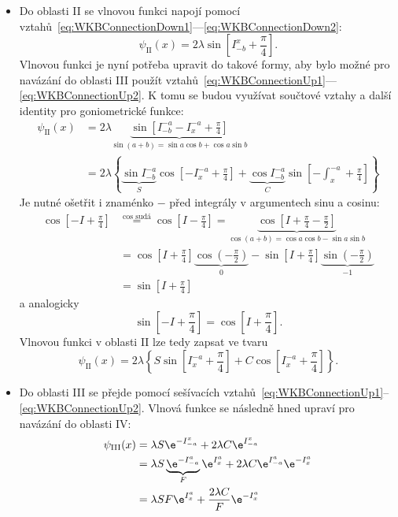 \begin{solution}
\begin{enumerate}
\begin{itemize}
		\item
			Do oblasti II se vlnovou funkci napojí pomocí vztahů~\eqref{eq:WKBConnectionDown1}---\eqref{eq:WKBConnectionDown2}:
			\begin{equation}
				\psi_{\mathrm{II}}(x)=2\lambda\sin{\left[I_{-b}^{x}+\frac{\pi}{4}\right]}.
			\end{equation}
			Vlnovou funkci je nyní potřeba upravit do takové formy, aby bylo možné pro navázání do oblasti III použít vztahů~\eqref{eq:WKBConnectionUp1}---\eqref{eq:WKBConnectionUp2}.
			K tomu se budou využívat součtové vztahy a další identity pro goniometrické funkce:
			\begin{align}
				\psi_{\mathrm{II}}(x)
					&=2\lambda\underbrace{\sin{\left[I_{-b}^{-a}-I_{x}^{-a}+\frac{\pi}{4}\right]}}_{\sin{(a+b)}=\sin{a}\cos{b}+\cos{a}\sin{b}}\nonumber\\
					&=2\lambda\left\{\underbrace{\sin{I_{-b}^{-a}}}_{S}\cos\left[-I_{x}^{-a}+\frac{\pi}{4}\right]+\underbrace{\cos{I_{-b}^{-a}}}_{C}\sin\left[-\int_{x}^{-a}+\frac{\pi}{4}\right]\right\}
			\end{align}
			Je nutné ošetřit i znaménko $-$ před integrály v argumentech sinu a cosinu:
			\begin{align}
				\cos\left[-I+\frac{\pi}{4}\right]
					&\stackrel{\cos\text{ sudá}}{=}\cos\left[I-\frac{\pi}{4}\right]=\underbrace{\cos\left[I+\frac{\pi}{4}-\frac{\pi}{2}\right]}_{\cos{(a+b)}=\cos{a}\cos{b}-\sin{a}\sin{b}}\nonumber\\
					&=\cos\left[I+\frac{\pi}{4}\right]\underbrace{\cos\left(-\frac{\pi}{2}\right)}_{0}-\sin\left[I+\frac{\pi}{4}\right]\underbrace{\sin\left(-\frac{\pi}{2}\right)}_{-1}\nonumber\\
					&=\sin\left[I+\frac{\pi}{4}\right]
			\end{align}
			a analogicky
			\begin{equation}
				\sin\left[-I+\frac{\pi}{4}\right]=\cos\left[I+\frac{\pi}{4}\right].
			\end{equation}
			Vlnovou funkci v oblasti II lze tedy zapsat ve tvaru
			\begin{equation}
				\psi_{\mathrm{II}}(x)=2\lambda\left\{S\sin\left[I_{x}^{-a}+\frac{\pi}{4}\right]+C\cos\left[I_{x}^{-a}+\frac{\pi}{4}\right]\right\}.
			\end{equation}
		
		\item
			Do oblasti III se přejde pomocí sešívacích vztahů~\eqref{eq:WKBConnectionUp1}--\eqref{eq:WKBConnectionUp2}.
			Vlnová funkce se následně hned upraví pro navázání do oblasti IV:
			\begin{align}
				\psi_{\mathrm{III}}(x)
					&=\lambda S\e^{-I_{-a}^{x}}+2\lambda C\e^{I_{-a}^{x}}\nonumber\\
					&=\lambda S\underbrace{\e^{-I_{-a}^{a}}}_{F}\e^{I_{x}^{a}}+2\lambda C\e^{I_{-a}^{a}}\e^{-I_{x}^{a}}\nonumber\\
					&=\lambda SF\e^{I_{x}^{a}}+\frac{2\lambda C}{F}\e^{-I_{x}^{a}}
			\end{align}
			

\end{itemize}
\end{enumerate}
\end{solution}
